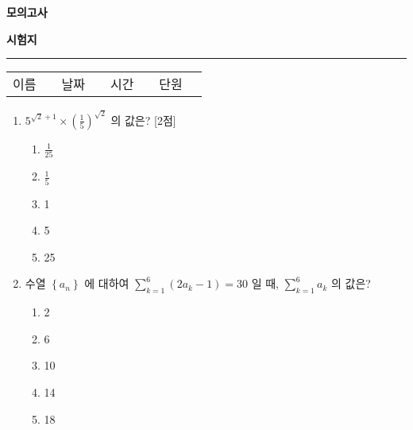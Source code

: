 \documentclass[10.5pt]{article}
\begin{document}
\thispagestyle{fancy}
\vspace*{-6mm}
\hfill{\bfseries 모의고사}
\begin{center}{\bfseries\LARGE 시험지}\end{center}
{\color{examBlue}\rule{\linewidth}{0.9pt}}
\vspace{2mm}
\renewcommand{\arraystretch}{1.35}
\begin{tabularx}{\linewidth}{@{}lX lX lX lX@{}}
이름 & \hrulefill & 날짜 & \hrulefill & 시간 & \hrulefill & 단원 & \hrulefill \\
\end{tabularx}
\vspace{8mm}
\begin{multicols}{2}
\begin{enumerate}
\item \leavevmode\begin{minipage}[t]{\linewidth}
$5^{\sqrt{2}+1} \times\left(\frac{1}{5}\right)^{\sqrt{2}}$ 의 값은? [2점]
\vspace{0.5em}
\begin{enumerate}[label={\textcircled{\arabic*}}, itemsep=0.2em, topsep=0.2em, leftmargin=*, align=left]
\item $\frac{1}{25}$
\item $\frac{1}{5}$
\item 1
\item 5
\item 25
\end{enumerate}
\par\vspace{12\baselineskip}
\end{minipage}
\item \leavevmode\begin{minipage}[t]{\linewidth}
수열 $\left\{a_{n}\right\}$ 에 대하여 $\sum_{k=1}^{6}\left(2 a_{k}-1\right)=30$ 일 때, $\sum_{k=1}^{6} a_{k}$ 의 값은?
\vspace{0.5em}
\begin{enumerate}[label={\textcircled{\arabic*}}, itemsep=0.2em, topsep=0.2em, leftmargin=*, align=left]
\item 2
\item 6
\item 10
\item 14
\item 18
\end{enumerate}
\par\vspace{12\baselineskip}
\end{minipage}

\end{enumerate}
\end{multicols}
\end{document}
